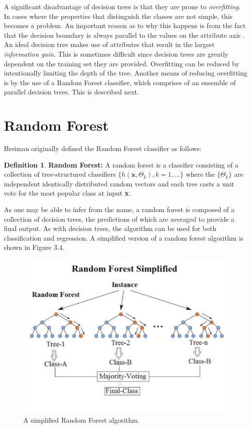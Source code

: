 \documentclass[a4paper, 12pt]{report}
\theoremstyle{definition}
\newtheorem{definition}{Definition}[section]
\begin{document}
A significant disadvantage of decision trees is that they are prone to \textit{overfitting}. \autocite{storey_2018} In cases where the properties that distinguish the classes are not simple, this becomes a problem. An important reason as to why this happens is from the fact that the decision boundary is always parallel to the values on the attribute axis \autocite{chakure_2019}. An ideal decision tree makes use of attributes that result in the largest \textit{information gain}. This is sometimes difficult since decision trees are greatly dependent on the training set they are provided. Overfitting can be reduced by intentionally limiting the depth of the tree. Another means of reducing overfitting is by the use of a Random Forest classifier, which comprises of an ensemble of parallel decision trees. This is described next.

\section{Random Forest}

Breiman originally defined the Random Forest classifier as follows:

\theoremstyle{definition}
\begin{definition}{\textbf{Random Forest:}}
A random forest is a classifier consisting of a collection of tree-structured classifiers $\{h(\textbf{x}, \Theta_k ), k = 1, \dots\}$ where the $\{\Theta_k\}$ are independent identically distributed random vectors and each tree casts a unit vote for the most popular class at input \textbf{x}. \autocite{breiman2001random}
\end{definition}

As one may be able to infer from the name, a random forest is composed of a collection of decision trees, the predictions of which are averaged to provide a final output. As with decision trees, the algorithm can be used for both classification and regression. A simplified version of a random forest algorithm is shown in Figure 3.4.\autocite{RandomForestArch} 

\begin{figure}[h!]
  \centering
  \includegraphics[width=0.75\linewidth]{im/Random_forest_diagram_complete.png}
  \caption{A simplified Random Forest algorithm.}
  \label{fig:RF1}
\end{figure}
\end{document}
